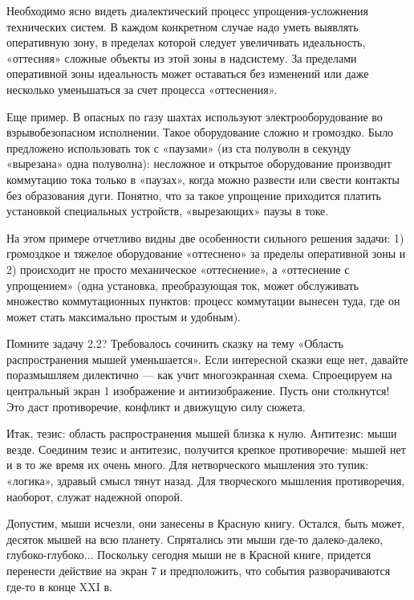 Необходимо  ясно  видеть диалектический  процесс  упрощения-усложнения
технических  систем. В  каждом конкретном  случае надо  уметь выявлять
оперативную зону, в пределах  которой следует увеличивать идеальность,
«оттесняя» сложные  объекты из  этой зоны  в надсистему.  За пределами
оперативной зоны  идеальность может оставаться без  изменений или даже
несколько уменьшаться за счет процесса «оттеснения».

Еще пример. В опасных по газу шахтах используют электрооборудование во
взрывобезопасном  исполнении. Такое  оборудование сложно  и громоздко.
Было  предложено  использовать ток  с  «паузами»  (из ста  полуволн  в
секунду «вырезана» одна полуволна):  несложное и открытое оборудование
производит коммутацию тока только в «паузах», когда можно развести или
свести контакты без образования дуги.  Понятно, что за такое упрощение
приходится  платить  установкой  специальных  устройств,  «вырезающих»
паузы в токе.

На  этом  примере отчетливо  видны  две  особенности сильного  решения
задачи: 1)  громоздкое и  тяжелое оборудование «оттеснено»  за пределы
оперативной зоны и 2)  происходит не просто механическое «оттеснение»,
а  «оттеснение  с  упрощением»  (одна  установка,  преобразующая  ток,
может обслуживать множество коммутационных пунктов: процесс коммутации
вынесен туда, где он может стать максимально простым и удобным).


Помните  задачу  2.2? Требовалось  сочинить  сказку  на тему  «Область
распространения мышей  уменьшается». Если  интересной сказки  еще нет,
давайте  поразмышляем  дилектично  —  как  учит  многоэкранная  схема.
Спроецируем  на центральный  экран  1  изображение и  антиизображение.
Пусть они столкнутся! Это даст  противоречие, конфликт и движущую силу
сюжета.


Итак, тезис:  область распространения мышей близка  к нулю. Антитезис:
мыши   везде.   Соединим   тезис  и   антитезис,   получится   крепкое
противоречие:  мышей  нет  и  в  то  же  время  их  очень  много.  Для
нетворческого мышления это тупик: «логика», здравый смысл тянут назад.
Для  творческого  мышления  противоречия,  наоборот,  служат  надежной
опорой.

Допустим, мыши  исчезли, они занесены  в Красную книгу.  Остался, быть
может,  десяток  мышей на  всю  планету.  Спрятались эти  мыши  где-то
далеко-далеко, глубоко-глубоко... Поскольку сегодня  мыши не в Красной
книге,  придется перенести  действие на  экран 7  и предположить,  что
события разворачиваются где-то в конце XXI в.

